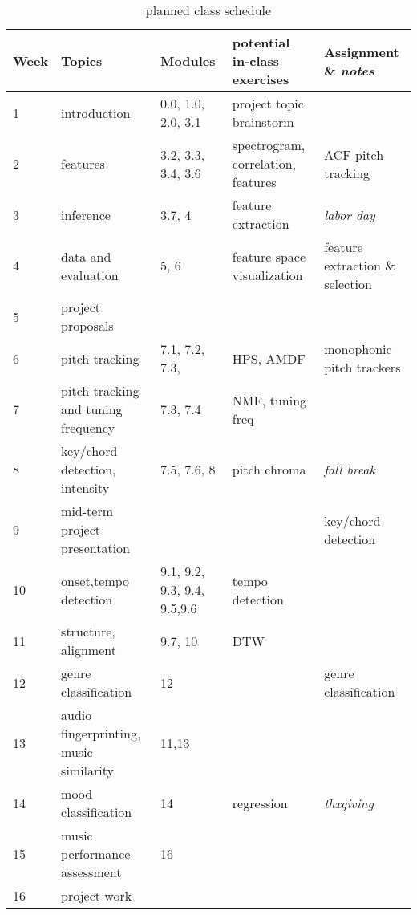 \documentclass[letterpaper,oneside,10pt]{scrartcl}
\begin{document}
        \begin{table}
		\begin{tabular}{l|p{}|p{}|p{}|p{}}
            Week & Topics & Modules & potential in-class exercises & Assignment \& \textit{notes}\\
            \hline\hline
            1 & introduction & 0.0, 1.0, 2.0, 3.1 & project topic brainstorm& \\
            2 &  features & 3.2, 3.3, 3.4, 3.6 & spectrogram, correlation, features & ACF pitch tracking\\
            3 & inference& 3.7, 4& feature extraction & \textit{labor day}\\  %
            4 & data and evaluation & 5, 6 & feature space visualization& feature extraction \& selection\\ %
            5 & project proposals &&& \\ %
            6 & pitch tracking& 7.1, 7.2, 7.3, & HPS, AMDF& monophonic pitch trackers\\
            7 & pitch tracking and tuning frequency & 7.3, 7.4 & NMF, tuning freq &\\
            8 & key/chord detection, intensity & 7.5, 7.6, 8 &pitch chroma&   \textit{fall break}\\
            9 & mid-term project presentation &&& key/chord detection\\
            10 & onset,tempo detection& 9.1, 9.2, 9.3, 9.4, 9.5,9.6 & tempo detection & \\ %
            11 & structure, alignment& 9.7, 10 & DTW&\\
            12 &  genre classification & 12&& genre classification\\
            13 & audio fingerprinting, music similarity&11,13&& \\
            14 & mood classification &14& regression& \textit{thxgiving} \\ 
            15 & music performance assessment &16&& \\ %
            16 & project work&&& \\
            
		\end{tabular}
        \caption{planned class schedule}\label{tab:schedule}
        \end{table}

        
    
\end{document}
